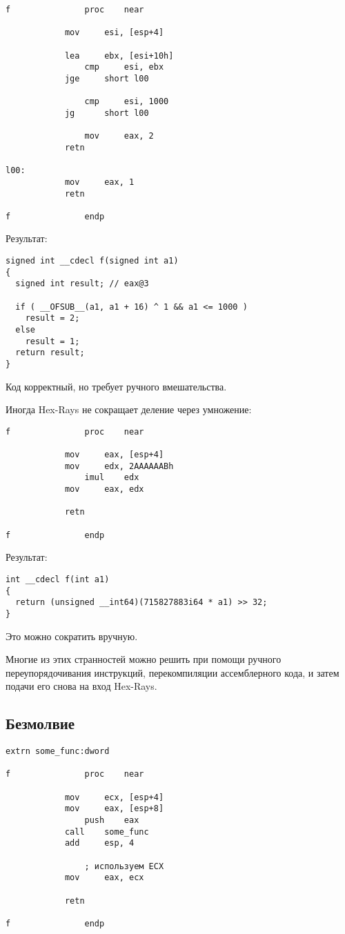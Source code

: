 \begin{lstlisting}
f               proc    near

	        mov     esi, [esp+4]

        	lea     ebx, [esi+10h]
                cmp     esi, ebx
	        jge     short l00

                cmp     esi, 1000
	        jg      short l00

                mov     eax, 2
	        retn

l00:
	        mov     eax, 1
        	retn

f               endp
\end{lstlisting}

Результат:

\begin{lstlisting}
signed int __cdecl f(signed int a1)
{
  signed int result; // eax@3

  if ( __OFSUB__(a1, a1 + 16) ^ 1 && a1 <= 1000 )
    result = 2;
  else
    result = 1;
  return result;
}
\end{lstlisting}

Код корректный, но требует ручного вмешательства.

Иногда Hex-Rays не сокращает деление через умножение:

\begin{lstlisting}
f               proc    near

        	mov     eax, [esp+4]
	        mov     edx, 2AAAAAABh
                imul    edx
        	mov     eax, edx

	        retn

f               endp
\end{lstlisting}

Результат:

\begin{lstlisting}
int __cdecl f(int a1)
{
  return (unsigned __int64)(715827883i64 * a1) >> 32;
}
\end{lstlisting}

Это можно сократить вручную.

Многие из этих странностей можно решить при помощи ручного переупорядочивания инструкций, перекомпиляции ассемблерного кода,
и затем подачи его снова на вход Hex-Rays.

\subsection{Безмолвие}

\begin{lstlisting}
extrn some_func:dword

f               proc    near

        	mov     ecx, [esp+4]
	        mov     eax, [esp+8]
                push    eax
        	call    some_func
	        add     esp, 4

                ; используем ECX
        	mov     eax, ecx

	        retn

f               endp
\end{lstlisting}

